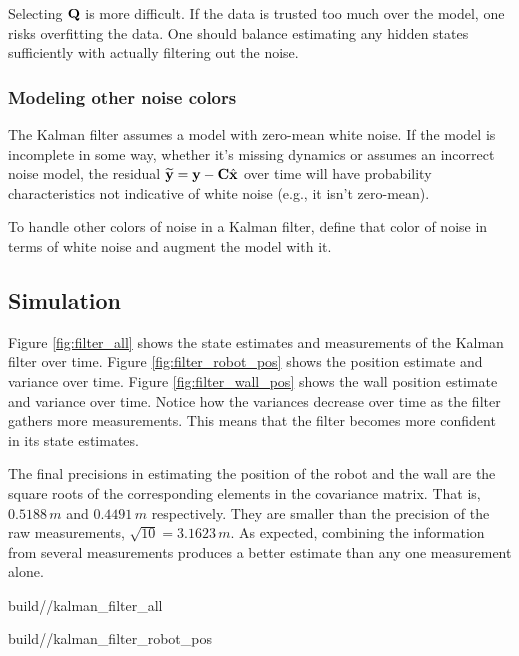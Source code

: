 Selecting $\mathbf{Q}$ is more difficult. If the data is trusted too much over the
model, one risks overfitting the data. One should balance estimating any hidden
\glspl{state} sufficiently with actually filtering out the noise.

\subsubsection{Modeling other noise colors}

The Kalman filter assumes a \gls{model} with zero-mean white noise. If the
\gls{model} is incomplete in some way, whether it's missing dynamics or assumes
an incorrect noise \gls{model}, the residual
$\widetilde{\mathbf{y}} = \mathbf{y} - \mathbf{C}\hat{\mathbf{x}}$ over time will have
probability characteristics not indicative of white noise (e.g., it isn't
zero-mean).

To handle other colors of noise in a Kalman filter, define that color of noise
in terms of white noise and augment the \gls{model} with it.

\subsection{Simulation}
\label{subsec:filter_simulation}

Figure \ref{fig:filter_all} shows the \gls{state} estimates and measurements of
the Kalman filter over time. Figure \ref{fig:filter_robot_pos} shows the
position estimate and variance over time. Figure \ref{fig:filter_wall_pos} shows
the wall position estimate and variance over time. Notice how the variances
decrease over time as the filter gathers more measurements. This means that the
filter becomes more confident in its \gls{state} estimates.

The final precisions in estimating the position of the robot and the wall are
the square roots of the corresponding elements in the covariance matrix. That
is, $0.5188\,m$ and $0.4491\,m$ respectively. They are smaller than the
precision of the raw measurements, $\sqrt{10} = 3.1623\,m$. As expected,
combining the information from several measurements produces a better estimate
than any one measurement alone.

\begin{svg}{build/\chapterpath/kalman_filter_all}
  \caption{State estimates and measurements with Kalman filter}
  \label{fig:filter_all}
\end{svg}

\begin{svg}{build/\chapterpath/kalman_filter_robot_pos}
  \caption{Robot position estimate and variance with Kalman filter}
  \label{fig:filter_robot_pos}
\end{svg}

